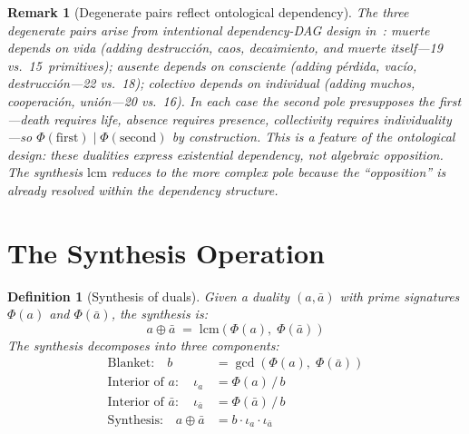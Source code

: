 \documentclass[11pt,a4paper]{article}
\newtheorem{definition}[theorem]{Definition}
\newtheorem{remark}[theorem]{Remark}
\begin{document}
\begin{remark}[Degenerate pairs reflect ontological dependency]
\label{rem:degenerate}
The three degenerate pairs arise from intentional dependency-DAG
design in~\citet{p4}: \emph{muerte} depends on \emph{vida}
(adding destrucci\'on, caos, decaimiento, and muerte itself---19
vs.\ 15~primitives); \emph{ausente} depends on \emph{consciente}
(adding p\'erdida, vac\'io, destrucci\'on---22 vs.\ 18);
\emph{colectivo} depends on \emph{individual} (adding muchos,
cooperaci\'on, uni\'on---20 vs.\ 16). In each case the second pole
\emph{presupposes} the first---death requires life, absence
requires presence, collectivity requires individuality---so
$\Phi(\text{first})\mid\Phi(\text{second})$ by construction. This
is a feature of the ontological design: these dualities express
\emph{existential dependency}, not algebraic opposition. The
synthesis $\mathrm{lcm}$ reduces to the more complex pole because
the ``opposition'' is already resolved within the dependency
structure.
\end{remark}

\section{The Synthesis Operation}
\label{sec:synthesis}

\begin{definition}[Synthesis of duals]
\label{def:synthesis}
Given a duality $(a,\bar{a})$ with prime signatures $\Phi(a)$ and
$\Phi(\bar{a})$, the \emph{synthesis} is:
\begin{equation}
a \oplus \bar{a} \;=\; \mathrm{lcm}(\Phi(a),\;\Phi(\bar{a}))
\end{equation}
The synthesis decomposes into three components:
\begin{align}
\text{Blanket:}\quad b &= \gcd(\Phi(a),\;\Phi(\bar{a}))
  \label{eq:blanket}\\
\text{Interior of } a:\quad \iota_a &= \Phi(a)\,/\,b
  \label{eq:int_a}\\
\text{Interior of } \bar{a}:\quad \iota_{\bar{a}} &=
  \Phi(\bar{a})\,/\,b \label{eq:int_abar}\\
\text{Synthesis:}\quad a \oplus \bar{a} &= b \cdot \iota_a \cdot
  \iota_{\bar{a}} \label{eq:synth}
\end{align}
\end{definition}
\end{document}
